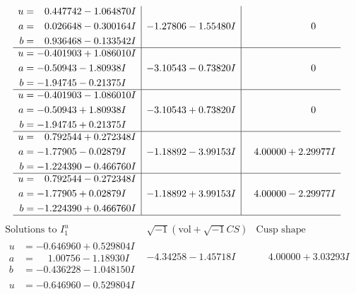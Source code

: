 \documentclass[1p]{elsarticle_modified}
\theoremstyle{definition}
\newcommand{\I}{\sqrt{-1}}
\begin{document}
$$\begin{array}{c|c|c}
\begin{aligned}
u &= \phantom{-}0.447742 - 1.064870 I \\
a &= \phantom{-}0.026648 - 0.300164 I \\
b &= \phantom{-}0.936468 - 0.133542 I\end{aligned}
 & -1.27806 - 1.55480 I & \phantom{-0.000000 } 0 \\ \hline\begin{aligned}
u &= -0.401903 + 1.086010 I \\
a &= -0.50943 - 1.80938 I \\
b &= -1.94745 - 0.21375 I\end{aligned}
 & -3.10543 - 0.73820 I & \phantom{-0.000000 } 0 \\ \hline\begin{aligned}
u &= -0.401903 - 1.086010 I \\
a &= -0.50943 + 1.80938 I \\
b &= -1.94745 + 0.21375 I\end{aligned}
 & -3.10543 + 0.73820 I & \phantom{-0.000000 } 0 \\ \hline\begin{aligned}
u &= \phantom{-}0.792544 + 0.272348 I \\
a &= -1.77905 - 0.02879 I \\
b &= -1.224390 - 0.466760 I\end{aligned}
 & -1.18892 - 3.99153 I & \phantom{-}4.00000 + 2.29977 I \\ \hline\begin{aligned}
u &= \phantom{-}0.792544 - 0.272348 I \\
a &= -1.77905 + 0.02879 I \\
b &= -1.224390 + 0.466760 I\end{aligned}
 & -1.18892 + 3.99153 I & \phantom{-}4.00000 - 2.29977 I\\
 \hline 
 \end{array}$$\newpage$$\begin{array}{c|c|c}  
\text{Solutions to }I^u_{1}& \I (\text{vol} + \sqrt{-1}CS) & \text{Cusp shape}\\
 \hline 
\begin{aligned}
u &= -0.646960 + 0.529804 I \\
a &= \phantom{-}1.00756 - 1.18930 I \\
b &= -0.436228 - 1.048150 I\end{aligned}
 & -4.34258 - 1.45718 I & \phantom{-}4.00000 + 3.03293 I \\ \hline\begin{aligned}
u &= -0.646960 - 0.529804 I \\

\end{aligned}
\end{array}$$
\end{document}
